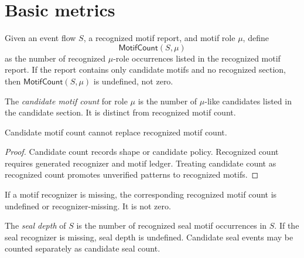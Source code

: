 \section{Basic metrics}
\label{sec:metric-report-basic-metrics}

\begin{definition}
\label{def:metric-report-recognized-motif-count}
Given an event flow $S$, a recognized motif report, and motif role $\mu$, define
$$
  \mathsf{MotifCount}(S,\mu)
$$
as the number of recognized $\mu$-role occurrences listed in the recognized motif report. If the report contains only candidate motifs and no recognized section, then $\mathsf{MotifCount}(S,\mu)$ is undefined, not zero.
\end{definition}

\begin{definition}
\label{def:metric-report-candidate-motif-count}
The \emph{candidate motif count} for role $\mu$ is the number of $\mu$-like candidates listed in the candidate section. It is distinct from recognized motif count.
\end{definition}

\begin{proposition}
\label{prop:metric-report-candidate-count-weaker}
Candidate motif count cannot replace recognized motif count.
\end{proposition}

\begin{proof}
Candidate count records shape or candidate policy. Recognized count requires generated recognizer and motif ledger. Treating candidate count as recognized count promotes unverified patterns to recognized motifs.
\end{proof}

\begin{corollary}
\label{cor:metric-report-missing-not-zero}
If a motif recognizer is missing, the corresponding recognized motif count is undefined or recognizer-missing. It is not zero.
\end{corollary}

\begin{definition}
\label{def:metric-report-seal-depth}
The \emph{seal depth} of $S$ is the number of recognized seal motif occurrences in $S$. If the seal recognizer is missing, seal depth is undefined. Candidate seal events may be counted separately as candidate seal count.
\end{definition}

